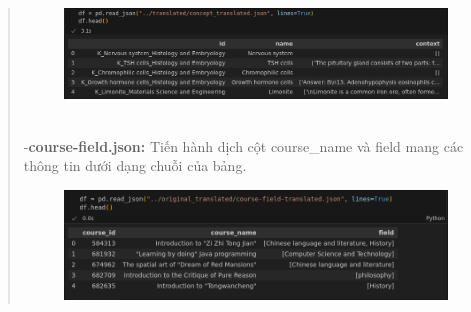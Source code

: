\begin{quote}
\begin{figure}[h]
    \centering
    \includegraphics[width=1\linewidth]{figures/5.png}
\end{figure}\\
-\textbf{course-field.json:} Tiến hành dịch cột course\_name và field mang các thông tin dưới dạng chuỗi của bảng.\\
\begin{figure}[h]
    \centering
    \includegraphics[width=1\linewidth]{figures/6.png}
\end{figure}
\end{quote}

